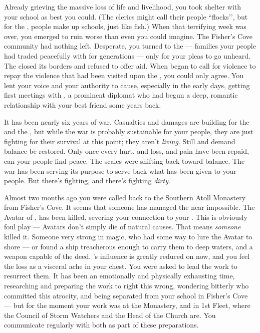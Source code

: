 \documentclass[char]{GL2020}
\begin{document}
Already grieving the massive loss of life and livelihood, you took shelter with your school as best you could. (The \pFarm{} clerics might call their people ``flocks’’, but for the \pShip{}, people make up schools, just like fish.) When that terrifying week was over, you emerged to ruin worse than even you could imagine. The Fisher’s Cove community had nothing left. Desperate, you turned to the \pFarm{} — families your people had traded peacefully with for generations — only for your pleas to go unheard. The \pFarm{} closed its borders and refused to offer aid. When \cLoud{\full} began to call for violence to repay the violence that had been visited upon the \pShip{}, you could only agree. You lent your voice and your authority to \cLoud{\their} cause, especially in the early days, getting \cLoud{} \cLoud{\their} first meetings with \cHeadDiplomat{\full}, a prominent \pShip{} diplomat who had begun a deep, romantic relationship with your best friend some years back.

It has been nearly six years of war. Casualties and damages are building for the \pFarm{} and the \pTech{}, but while the war is probably sustainable for your people, they are just fighting for their survival at this point; they aren’t \emph{living}. Still \cEbb{} and \cFlow{} demand balance be restored. Only once every hurt, and loss, and pain have been repaid, can your people find peace. The scales were shifting back toward balance. The war has been serving its purpose to serve back what has been given to your people. But there’s fighting, and there’s fighting \emph{dirty}. 

Almost two months ago you were called back to the Southern Atoll Monastery from Fisher’s Cove. It seems that someone has managed the near impossible. The Avatar of \cEbb{}, has been killed, severing your connection to your \cEbb{\deity}. This is obviously foul play — Avatars don't simply die of natural causes. That means \emph{someone} killed it. Someone very strong in magic, who had some way to lure the Avatar to shore — or found a ship treacherous enough to carry them to deep waters, and a weapon capable of the deed. \cEbb{}’s influence is greatly reduced on \pEarth{} now, and you feel the loss as a visceral ache in your chest. You were asked to lead the work to resurrect them. It has been an emotionally and physically exhausting time, researching and preparing the work to right this wrong, wondering bitterly who committed this atrocity, and being separated from your school in Fisher’s Cove — but for the moment your work was at the Monastery, and in 1st Fleet, where the Council of Storm Watchers and the Head of the Church are. You communicate regularly with both as part of these preparations.
\end{document}
